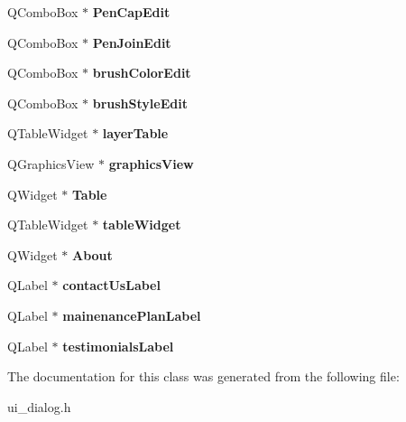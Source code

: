 \begin{DoxyCompactItemize}
Q\+Combo\+Box $\ast$ {\bfseries Pen\+Cap\+Edit}
\item 
\mbox{\label{class_ui___dialog_ac589d33c987fb9a7ecc6b6de683f2882}} 
Q\+Combo\+Box $\ast$ {\bfseries Pen\+Join\+Edit}
\item 
\mbox{\label{class_ui___dialog_a624f6731f87db942d68eca53f0c06e25}} 
Q\+Combo\+Box $\ast$ {\bfseries brush\+Color\+Edit}
\item 
\mbox{\label{class_ui___dialog_afd29a2d70334893b6d177c9a57f33b6b}} 
Q\+Combo\+Box $\ast$ {\bfseries brush\+Style\+Edit}
\item 
\mbox{\label{class_ui___dialog_af2ecd6be4b8d7b0f0c7685a608d13656}} 
Q\+Table\+Widget $\ast$ {\bfseries layer\+Table}
\item 
\mbox{\label{class_ui___dialog_a95e25d36a940c3e3e4a684c7dea1dece}} 
Q\+Graphics\+View $\ast$ {\bfseries graphics\+View}
\item 
\mbox{\label{class_ui___dialog_a9c68cd2b3268c177e82f4a7ad317009d}} 
Q\+Widget $\ast$ {\bfseries Table}
\item 
\mbox{\label{class_ui___dialog_a87b7964eb92867741cdb514cfbbbddbb}} 
Q\+Table\+Widget $\ast$ {\bfseries table\+Widget}
\item 
\mbox{\label{class_ui___dialog_aa53861d342d8fc315ddb095541f9115f}} 
Q\+Widget $\ast$ {\bfseries About}
\item 
\mbox{\label{class_ui___dialog_ada792e4089e6aa0034786baecfe27854}} 
Q\+Label $\ast$ {\bfseries contact\+Us\+Label}
\item 
\mbox{\label{class_ui___dialog_a6502473db1f2a5c6a1f3f8a1415ee404}} 
Q\+Label $\ast$ {\bfseries mainenance\+Plan\+Label}
\item 
\mbox{\label{class_ui___dialog_aa47dad1533d0a5db4aca7c604378210c}} 
Q\+Label $\ast$ {\bfseries testimonials\+Label}
\end{DoxyCompactItemize}


The documentation for this class was generated from the following file\+:\begin{DoxyCompactItemize}
\item 
ui\+\_\+dialog.\+h\end{DoxyCompactItemize}
